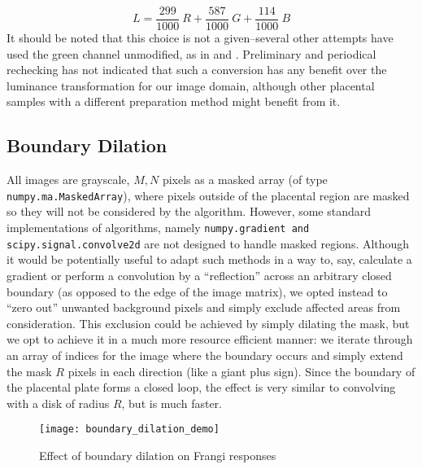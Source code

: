     \begin{equation} \label{eq:luma_transform}
    L =  \frac{299}{1000}\ R + \frac{587}{1000}\ G + \frac{114}{1000}\ B
    \end{equation}
    It should be noted that this choice is not a given--several other attempts have used the green channel unmodified, as in \cite{almoussa-ucla-reu} and \cite{huynh2013filter}. Preliminary and periodical rechecking has not indicated that such a conversion has any benefit over the luminance transformation for our image domain, although other placental samples with a different preparation method might benefit from it.

    \subsection{Boundary Dilation}
    
    All images are grayscale, $M,N$ pixels as a masked array (of type
    \texttt{numpy.ma.MaskedArray}), where pixels outside of the placental region are masked so they will not be considered by the algorithm. However, some standard
    implementations of algorithms, namely \texttt{numpy.gradient and scipy.signal.convolve2d} are not designed to handle masked regions. Although it would be potentially useful to adapt such methods in a way to, say, calculate a gradient or perform a convolution by a ``reflection'' across an arbitrary closed boundary (as opposed to the edge of the image matrix), we opted instead to ``zero out'' unwanted background pixels and simply exclude affected areas from consideration. This exclusion could be achieved by
    simply dilating the mask, but we opt to achieve it in a much more resource efficient manner: we iterate through an array of indices for the image where the boundary occurs and simply extend the mask $R$ pixels in each direction (like a giant plus sign). Since the boundary of the placental plate forms a closed loop, the effect is very similar to convolving with a disk of radius $R$, but is much faster.
    
    \begin{figure} 
        \texttt{[image: boundary\_dilation\_demo]}
        \caption{Effect of boundary dilation on Frangi responses}
        \label{fig:boundary-demo}
    \end{figure}
    
